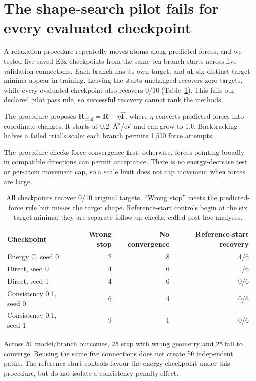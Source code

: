 \documentclass{article}
\begin{document}
\section{The shape-search pilot fails for every evaluated checkpoint}
A relaxation procedure repeatedly moves atoms along predicted forces, and we tested five saved E3x checkpoints from the same ten branch starts across five validation connections. Each branch has its own target, and all six distinct target minima appear in training. Leaving the starts unchanged recovers zero targets, while every evaluated checkpoint also recovers 0/10 (Table~\ref{tab:recovery}). This fails our declared pilot pass rule, so successful recovery cannot rank the methods.

The procedure proposes $\mathbf R_{\mathrm{trial}}=\mathbf R+\eta\widehat{\mathbf F}$, where $\eta$ converts predicted forces into coordinate changes. It starts at 0.2~\AA$^2$/eV and can grow to 1.0. Backtracking halves a failed trial's scale; each branch permits 1,500 force attempts.

The procedure checks force convergence first; otherwise, forces pointing broadly in compatible directions can permit acceptance. There is no energy-decrease test or per-atom movement cap, so a scale limit does not cap movement when forces are large.

\begin{table}[htbp]
\centering\small
\caption{All checkpoints recover 0/10 original targets. ``Wrong stop'' meets the predicted-force rule but misses the target shape. Reference-start controls begin at the six target minima; they are separate follow-up checks, called post-hoc analyses.}\label{tab:recovery}
\begin{tabular}{lrrr}\toprule
Checkpoint & Wrong stop & No convergence & Reference-start recovery\\\midrule
Energy C, seed 0 & 2 & 8 & 4/6\\
Direct, seed 0 & 4 & 6 & 1/6\\
Direct, seed 1 & 4 & 6 & 0/6\\
Consistency 0.1, seed 0 & 6 & 4 & 0/6\\
Consistency 0.1, seed 1 & 9 & 1 & 0/6\\\bottomrule
\end{tabular}
\end{table}

Across 50 model/branch outcomes, 25 stop with wrong geometry and 25 fail to converge. Reusing the same five connections does not create 50 independent paths. The reference-start controls favour the energy checkpoint under this procedure, but do not isolate a consistency-penalty effect.
\end{document}
